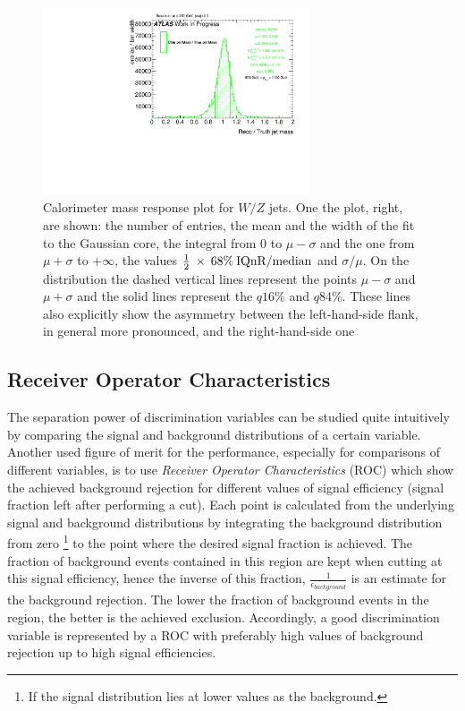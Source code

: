 \begin{figure}[!ht]
  \centering
      \includegraphics[width=0.7\textwidth]{jet_part/8ResponsePTJ_h_JetRatio_mJ05CALO.pdf}
  \caption[$\mcal$ response single $\pt$ bin]{Calorimeter mass response plot for $W/Z$ jets. One the plot, right, are shown: the number of entries, the mean and the width of the fit to the Gaussian core, the integral from 0 to $\mu-\sigma$ and the one from $\mu+\sigma$ to $+\infty$, the values $\frac{1}{2}\: \times\: 68\% \:\textrm{IQnR/median}$ and $\sigma/\mu$. On the distribution the dashed vertical lines represent the points $\mu-\sigma$ and $\mu+\sigma$ and the solid lines represent the $q16\%$ and $q84\%$. These lines also explicitly show the asymmetry between the left-hand-side flank, in general more pronounced, and the right-hand-side one}
  \label{fig:iqrbin}
\end{figure}


\subsection{Receiver Operator Characteristics}\label{sec:ROC}
The separation power of discrimination variables can be studied quite intuitively by comparing the signal and background distributions of a certain variable. Another used figure of merit for the performance, especially for comparisons of different variables, is to use \textit{Receiver Operator Characteristics} (ROC) which show the achieved background rejection for different values of signal efficiency (signal fraction left after performing a cut). 
Each point is calculated from the underlying signal and background distributions by integrating the background distribution from zero \footnote[1]{If the signal distribution lies at lower values as the background.} to the point where the desired signal fraction is achieved. The fraction of background events contained in this region are kept when cutting at this signal efficiency, hence the inverse of this fraction, $\frac{1}{\epsilon_{background}}$ is an estimate for the background rejection. The lower the fraction of background events in the region, the better is the achieved exclusion. Accordingly, a good discrimination variable is represented by a ROC with preferably high values of background rejection up to high signal efficiencies.

